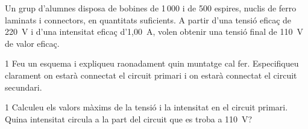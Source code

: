 Un grup d'alumnes disposa de bobines de 1\,000 i de 500 espires, nuclis de ferro laminats i connectors, en quantitats suficients. A partir d'una tensió eficaç de 220~V i d'una intensitat eficaç d'1,00~A, volen obtenir una tensió final de 110~V de valor eficaç.

\begin{apartat}{1}
Feu un esquema i expliqueu raonadament quin muntatge cal fer. Especifiqueu clarament on estarà connectat el circuit primari i on estarà connectat el circuit secundari.
\end{apartat}

\begin{apartat}{1}
Calculeu els valors màxims de la tensió i la intensitat en el circuit primari. Quina intensitat circula a la part del circuit que es troba a 110~V?
\end{apartat}

